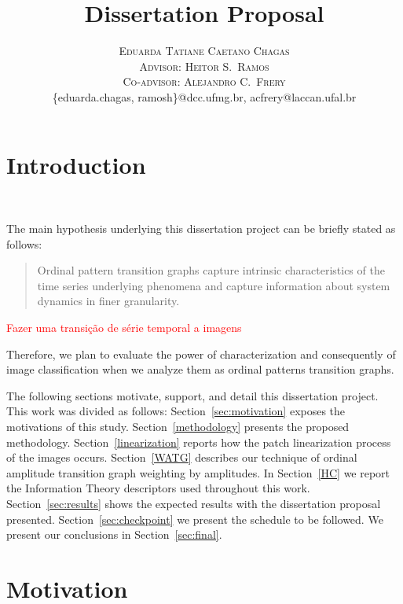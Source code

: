 \documentclass[paper=letter, fontsize=12pt]{article}
\title{\vspace{-10mm}\fontsize{24pt}{10pt}\selectfont\textbf{ 
Dissertation Proposal \\ \vspace{8mm} \normalfont{A study about ordinal patterns transition graphs}}}
\author{
\large
{\textsc{Eduarda Tatiane Caetano Chagas}}\\[2mm]
{\textsc{Advisor: Heitor S.\ Ramos}}\\[2mm]
{\textsc{Co-advisor: Alejandro C.\ Frery}}\\[2mm]
\normalsize {\{eduarda.chagas, ramosh\}@dcc.ufmg.br, acfrery@laccan.ufal.br}\\[2mm]
}
\date{}
\begin{document}
\maketitle 
\thispagestyle{fancy}

\onehalfspacing 

\section{Introduction}~\label{sec:introduction}

The main hypothesis underlying this dissertation project can be briefly stated as follows:

\begin{quote}

    Ordinal pattern transition graphs capture intrinsic characteristics of the time series underlying phenomena and capture information about system dynamics in finer granularity.
    
\end{quote}

\textcolor{red}{Fazer uma transição de s\'erie temporal a imagens}

Therefore, we plan to evaluate the power of characterization and consequently of image classification when we analyze them as ordinal patterns transition graphs.

The following sections motivate, support, and detail this dissertation project.
This work was divided as follows:
Section~\ref{sec:motivation} exposes the motivations of this study.
Section~\ref{methodology} presents the proposed methodology.
Section~\ref{linearization} reports how the patch linearization process of the images occurs.
Section~\ref{WATG} describes our technique of ordinal amplitude transition graph weighting by amplitudes.
In Section~\ref{HC} we report the Information Theory descriptors used throughout this work.
Section~\ref{sec:results} shows the expected results with the dissertation proposal presented.
Section~\ref{sec:checkpoint} we present the schedule to be followed.
We present our conclusions in Section~\ref{sec:final}.


\section{Motivation}~\label{sec:motivation}
\end{document}
